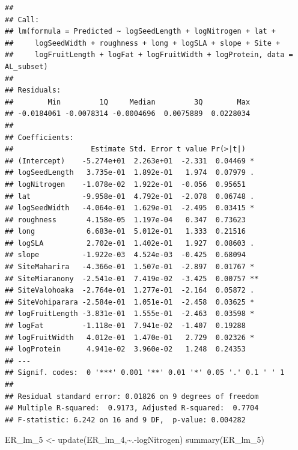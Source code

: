 \documentclass[
  12pt,
]{article}
\newenvironment{Shaded}{\begin{snugshade}}{\end{snugshade}}
\newcommand{\FunctionTok}[1]{\textcolor[rgb]{0.00,0.00,0.00}{#1}}
\newcommand{\NormalTok}[1]{#1}
\newcommand{\OtherTok}[1]{\textcolor[rgb]{0.56,0.35,0.01}{#1}}
\newcommand{\SpecialCharTok}[1]{\textcolor[rgb]{0.00,0.00,0.00}{#1}}
\begin{document}
\begin{verbatim}
## 
## Call:
## lm(formula = Predicted ~ logSeedLength + logNitrogen + lat + 
##     logSeedWidth + roughness + long + logSLA + slope + Site + 
##     logFruitLength + logFat + logFruitWidth + logProtein, data = AL_subset)
## 
## Residuals:
##        Min         1Q     Median         3Q        Max 
## -0.0184061 -0.0078314 -0.0004696  0.0075889  0.0228034 
## 
## Coefficients:
##                  Estimate Std. Error t value Pr(>|t|)   
## (Intercept)    -5.274e+01  2.263e+01  -2.331  0.04469 * 
## logSeedLength   3.735e-01  1.892e-01   1.974  0.07979 . 
## logNitrogen    -1.078e-02  1.922e-01  -0.056  0.95651   
## lat            -9.958e-01  4.792e-01  -2.078  0.06748 . 
## logSeedWidth   -4.064e-01  1.629e-01  -2.495  0.03415 * 
## roughness       4.158e-05  1.197e-04   0.347  0.73623   
## long            6.683e-01  5.012e-01   1.333  0.21516   
## logSLA          2.702e-01  1.402e-01   1.927  0.08603 . 
## slope          -1.922e-03  4.524e-03  -0.425  0.68094   
## SiteMaharira   -4.366e-01  1.507e-01  -2.897  0.01767 * 
## SiteMiaranony  -2.541e-01  7.419e-02  -3.425  0.00757 **
## SiteValohoaka  -2.764e-01  1.277e-01  -2.164  0.05872 . 
## SiteVohiparara -2.584e-01  1.051e-01  -2.458  0.03625 * 
## logFruitLength -3.831e-01  1.555e-01  -2.463  0.03598 * 
## logFat         -1.118e-01  7.941e-02  -1.407  0.19288   
## logFruitWidth   4.012e-01  1.470e-01   2.729  0.02326 * 
## logProtein      4.941e-02  3.960e-02   1.248  0.24353   
## ---
## Signif. codes:  0 '***' 0.001 '**' 0.01 '*' 0.05 '.' 0.1 ' ' 1
## 
## Residual standard error: 0.01826 on 9 degrees of freedom
## Multiple R-squared:  0.9173, Adjusted R-squared:  0.7704 
## F-statistic: 6.242 on 16 and 9 DF,  p-value: 0.004282
\end{verbatim}

\begin{Shaded}
\begin{Highlighting}[]
\NormalTok{ER\_lm\_5 }\OtherTok{\textless{}{-}} \FunctionTok{update}\NormalTok{(ER\_lm\_4,}\SpecialCharTok{\textasciitilde{}}\NormalTok{.}\SpecialCharTok{{-}}\NormalTok{logNitrogen)}
\FunctionTok{summary}\NormalTok{(ER\_lm\_5)}
\end{Highlighting}
\end{Shaded}
\end{document}
